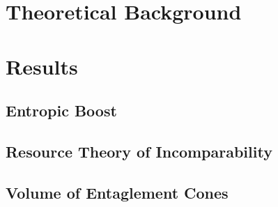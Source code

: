 \documentclass[a4paper, 11pt]{report}
\begin{document}
\renewcommand*{\familydefault}{lmss}
\renewcommand*{\rmdefault}{lmss}

\frontmatter






\renewcommand*{\familydefault}{lmr}
\renewcommand*{\rmdefault}{lmr}

%






\setcounter{tocdepth}{2}
\tableofcontents

\newpage
\mainmatter

\part{Theoretical Background}





\part{Results}

\chapter{Entropic Boost}

\chapter{Resource Theory of Incomparability}

\chapter{Volume of Entaglement Cones}








\backmatter


\printbibliography


%  
\end{document}
